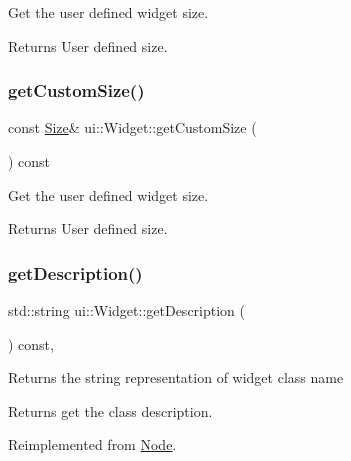Get the user defined widget size. \begin{DoxyReturn}{Returns}
User defined size. 
\end{DoxyReturn}
\mbox{\label{classui_1_1Widget_a86d86ee353d3246754e5a34e9b391ce4}} 
\subsubsection{\texorpdfstring{get\+Custom\+Size()}{getCustomSize()}\hspace{0.1cm}{\footnotesize\ttfamily [2/2]}}
{\footnotesize\ttfamily const \hyperlink{classSize}{Size}\& ui\+::\+Widget\+::get\+Custom\+Size (\begin{DoxyParamCaption}{ }\end{DoxyParamCaption}) const}

Get the user defined widget size. \begin{DoxyReturn}{Returns}
User defined size. 
\end{DoxyReturn}
\mbox{\label{classui_1_1Widget_ad85abdaa9133dc6b8efc32670ae9b93f}} 
\subsubsection{\texorpdfstring{get\+Description()}{getDescription()}\hspace{0.1cm}{\footnotesize\ttfamily [1/2]}}
{\footnotesize\ttfamily std\+::string ui\+::\+Widget\+::get\+Description (\begin{DoxyParamCaption}{ }\end{DoxyParamCaption}) const\hspace{0.3cm}{\ttfamily [override]}, {\ttfamily [virtual]}}

Returns the string representation of widget class name \begin{DoxyReturn}{Returns}
get the class description. 
\end{DoxyReturn}


Reimplemented from \hyperlink{classNode_a41710375a0d92a4ee54c39fe123b5912}{Node}.



